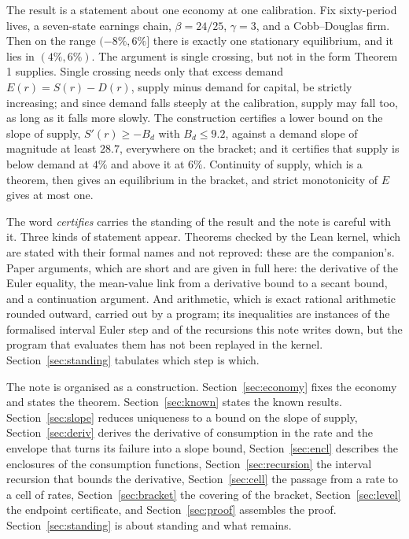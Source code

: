 \documentclass[11pt]{article}
\theoremstyle{definition}
\theoremstyle{remark}
\begin{document}
The result is a statement about one economy at one calibration. Fix sixty-period lives, a
seven-state earnings chain, $\beta=24/25$, $\gamma=3$, and a Cobb--Douglas firm. Then on the
range $(-8\%,6\%]$ there is exactly one stationary equilibrium, and it lies in $(4\%,6\%)$. The
argument is single
crossing, but not in the form Theorem 1 supplies. Single crossing needs only that excess demand
$E(r)=S(r)-D(r)$, supply minus demand for capital, be strictly increasing; and since demand falls
steeply at the calibration, supply may fall too, as long as it falls more slowly. The construction
certifies a lower bound on the slope of supply, $S'(r)\ge-B_d$ with $B_d\le9.2$, against a demand
slope of magnitude at least $28.7$, everywhere on the bracket; and it certifies that supply is below
demand at $4\%$ and above it at $6\%$. Continuity of supply, which is a theorem, then gives an
equilibrium in the bracket, and strict monotonicity of $E$ gives at most one.

The word \emph{certifies} carries the standing of the result and the note is careful with it. Three
kinds of statement appear. Theorems checked by the Lean kernel, which are stated with their formal
names and not reproved: these are the companion's. Paper arguments, which are short and are given
in full here: the derivative of the Euler equality, the mean-value link from a derivative bound to a
secant bound, and a continuation argument. And arithmetic, which is exact rational arithmetic
rounded outward, carried out by a program; its inequalities are instances of the formalised
interval Euler step and of the recursions this note writes down, but the program that evaluates
them has not been replayed in the kernel. Section~\ref{sec:standing} tabulates which step is which.

The note is organised as a construction. Section~\ref{sec:economy} fixes the economy and states the
theorem. Section~\ref{sec:known} states the known results. Section~\ref{sec:slope} reduces
uniqueness to a bound on the slope of supply, Section~\ref{sec:deriv} derives the derivative of
consumption in the rate and the envelope that turns its failure into a slope bound,
Section~\ref{sec:encl} describes the enclosures of the consumption functions,
Section~\ref{sec:recursion} the interval recursion that bounds the derivative,
Section~\ref{sec:cell} the passage from a rate to a cell of rates, Section~\ref{sec:bracket} the
covering of the bracket, Section~\ref{sec:level} the endpoint certificate, and
Section~\ref{sec:proof} assembles the proof. Section~\ref{sec:standing} is about standing and what
remains.
\end{document}

